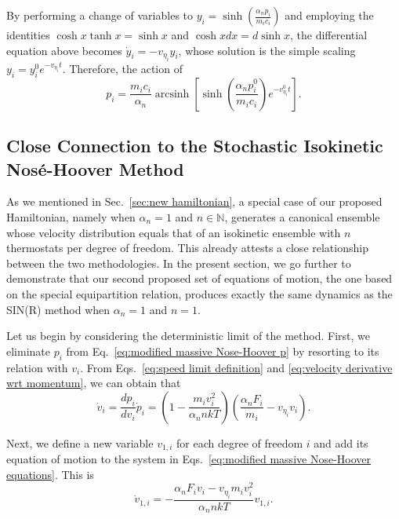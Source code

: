\documentclass[
aip,
jcp,
reprint,
]{revtex4-1}
\DeclareMathOperator\arcsinh{arcsinh}
\newcommand{\nn}{n}
\begin{document}
By performing a change of variables to $y_i = \sinh(\frac{\alpha_\nn p_i}{m_i c_i})$ and employing the identities $\cosh x \tanh x = \sinh x$ and $\cosh x dx = d\sinh x$, the differential equation above becomes $\dot{y}_i = -v_{\eta_i} y_i$, whose solution is the simple scaling $y_i = y_i^0 e^{-v_{\eta_i} t}$.
Therefore, the action of 
\begin{equation}
p_i = \frac{m_i c_i}{\alpha_\nn} \arcsinh\left[\sinh\left(\frac{\alpha_\nn p_i^0}{m_i c_i}\right)e^{-v_{\eta_i}^0 t}\right].
\end{equation}

\subsection{Close Connection to the Stochastic Isokinetic Nos\'e-Hoover Method}
\label{sec:modified NHC thermostatting}

As we mentioned in Sec.~\ref{sec:new hamiltonian}, a special case of our proposed Hamiltonian, namely when $\alpha_\nn = 1$ and $n \in \mathbb{N}$, generates a canonical ensemble whose velocity distribution equals that of an isokinetic ensemble \cite{Abreu_2020} with $\nn$ thermostats per degree of freedom.
This already attests a close relationship between the two methodologies.
In the present section, we go further to demonstrate that our second proposed set of equations of motion, the one based on the special equipartition relation, produces exactly the same dynamics as the SIN(R) method \cite{Leimkuhler_2013} when $\alpha_\nn = 1$ and $\nn = 1$.

Let us begin by considering the deterministic limit of the method.
First, we eliminate $p_i$ from Eq.~\eqref{eq:modified massive Nose-Hoover p} by resorting to its relation with $v_i$.
From Eqs.~\eqref{eq:speed limit definition} and \eqref{eq:velocity derivative wrt momentum}, we can obtain that
\begin{equation}
\label{eq:velocity equation}
\dot{v}_i = \frac{dp_i}{dv_i} \dot{p}_i = \left(1 - \frac{m_i v_i^2}{\alpha_\nn \nn k T}\right) \left(\frac{\alpha_\nn F_i}{m_i} - v_{\eta_i} v_i\right).
\end{equation}

Next, we define a new variable $v_{1,i}$ for each degree of freedom $i$ and add its equation of motion to the system in Eqs.~\eqref{eq:modified massive Nose-Hoover equations}.
This is
\begin{equation}
\label{eq:new driven variable equation}
\dot{v}_{1,i} = -\frac{\alpha_\nn F_i v_i - v_{\eta_i} m_i v_i^2}{\alpha_\nn \nn kT} v_{1,i}.
\end{equation}
\end{document}
